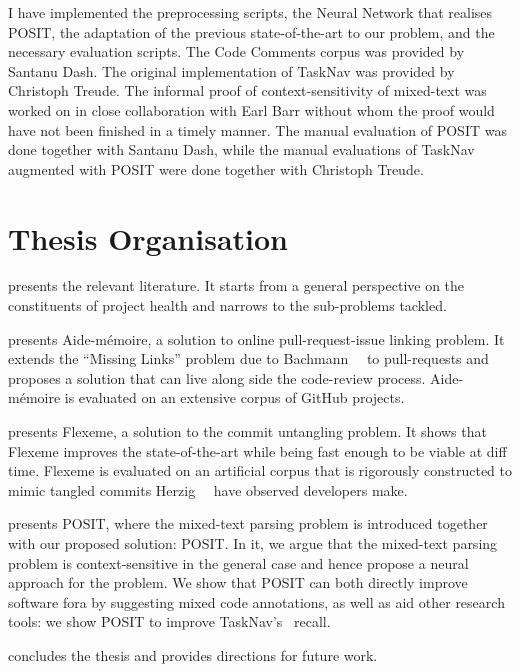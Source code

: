 \begin{itemize}[leftmargin=*]
    \noindent I have implemented the preprocessing scripts, the Neural Network
    that realises POSIT, the adaptation of the previous state-of-the-art to our
    problem, and the necessary evaluation scripts. The Code Comments corpus was
    provided by Santanu Dash. The original implementation of TaskNav was
    provided by Christoph Treude. The informal proof of context-sensitivity of
    mixed-text was worked on in close collaboration with Earl Barr without whom
    the proof would have not been finished in a timely manner. The manual
    evaluation of POSIT was done together with Santanu Dash, while the manual
    evaluations of TaskNav augmented with POSIT were done together with
    Christoph Treude.
\end{itemize}

\section{Thesis Organisation}
\label{chapter:introduction:sec:organisation}

 presents the relevant literature. It starts from a
general perspective on the constituents of project health and narrows to the
sub-problems tackled.

 presents Aide-mémoire, a solution to online pull-request-issue
linking problem. It extends the ``Missing Links'' problem due to
Bachmann~\etal~\cite{MissingLinks} to pull-requests and proposes a solution that
can live along side the code-review process. Aide-mémoire is evaluated on an
extensive corpus of GitHub projects.

 presents Flexeme, a solution to the commit untangling
problem. It shows that Flexeme improves the state-of-the-art while being fast
enough to be viable at diff time. Flexeme is evaluated on an artificial corpus
that is rigorously constructed to mimic tangled commits
Herzig~\etal~\cite{Herzig2016} have observed developers make.

 presents POSIT, where the mixed-text parsing problem is
introduced together with our proposed solution: POSIT. In it, we argue that the
mixed-text parsing problem is context-sensitive in the general case and hence
propose a neural approach for the problem. We show that POSIT can both directly
improve software fora by suggesting mixed code annotations, as well as aid other
research tools: we show POSIT to improve
TaskNav's~\cite{Treude:2015:TTN:2819009.2819128} recall.

 concludes the thesis and provides directions for
future work.